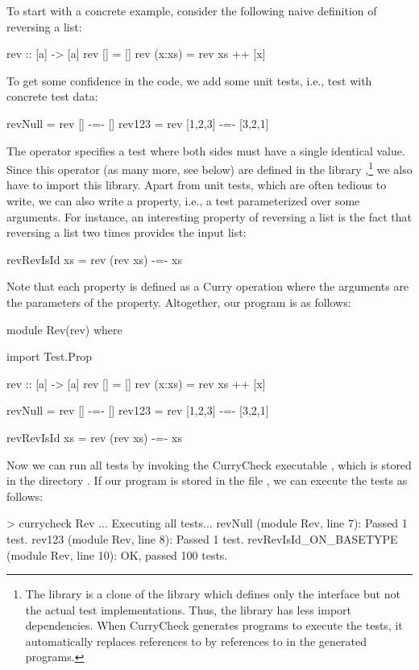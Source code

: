 To start with a concrete example, consider the following naive definition of
reversing a list:
\begin{curry}
rev :: [a] -> [a]
rev []     = []
rev (x:xs) = rev xs ++ [x]
\end{curry}
To get some confidence in the code, we add some unit tests,
i.e., test with concrete test data:
\begin{curry}
revNull = rev []      -=- []
rev123  = rev [1,2,3] -=- [3,2,1]
\end{curry}
The operator \ccode{-=-} specifies a test where both sides must
have a single identical value. Since this operator (as many more, see below)
are defined in the library ,\footnote{%
The library  is a clone of the library
which defines only the interface but not the actual test implementations.
Thus, the library  has less import dependencies.
When CurryCheck generates programs to execute the tests,
it automatically replaces references to 
by references to  in the generated programs.}
we also have to import this library.
Apart from unit tests, which are often tedious to write,
we can also write a property, i.e., a test parameterized over
some arguments. For instance, an interesting property of reversing a list
is the fact that reversing a list two times provides the input list:
\begin{curry}
revRevIsId xs = rev (rev xs) -=- xs
\end{curry}
Note that each property is defined as a Curry operation
where the arguments are the parameters of the property.
Altogether, our program is as follows:
\begin{curry}
module Rev(rev) where

import Test.Prop

rev :: [a] -> [a]
rev []     = []
rev (x:xs) = rev xs ++ [x]

revNull = rev []      -=- []
rev123  = rev [1,2,3] -=- [3,2,1]

revRevIsId xs = rev (rev xs) -=- xs
\end{curry}
Now we can run all tests by invoking the CurryCheck executable
, which is stored in the directory .
If our program is stored in the file ,
we can execute the tests as follows:
\begin{curry}
> currycheck Rev
...
Executing all tests...
revNull (module Rev, line 7):
 Passed 1 test.
rev123 (module Rev, line 8):
 Passed 1 test.
revRevIsId_ON_BASETYPE (module Rev, line 10):
 OK, passed 100 tests.
\end{curry}
